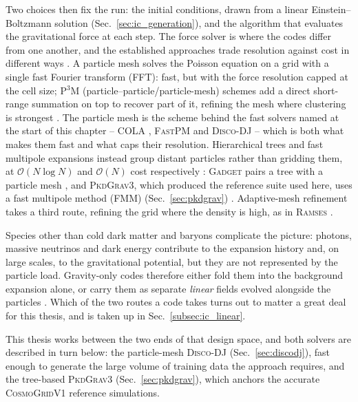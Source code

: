 \documentclass{report}
\begin{document}
Two choices then fix the run: the initial conditions, drawn from a linear Einstein--Boltzmann solution (Sec.~\ref{sec:ic_generation}), and the algorithm that evaluates the gravitational force at each step. The force solver is where the codes differ from one another, and the established approaches trade resolution against cost in different ways \cite{dehnen_n-body_2011}. A particle mesh solves the Poisson equation on a grid with a single fast Fourier transform (FFT): fast, but with the force resolution capped at the cell size; P$^3$M (particle--particle/particle-mesh) schemes add a direct short-range summation on top to recover part of it, refining the mesh where clustering is strongest \cite{couchman_mesh-refined_1991}. The particle mesh is the scheme behind the fast solvers named at the start of this chapter -- \textsc{COLA} \cite{tassev_solving_2013}, \textsc{FastPM} \cite{feng_fastpm_2016} and \textsc{Disco-DJ} \cite{list_disco-dj_2026} -- which is both what makes them fast and what caps their resolution. Hierarchical trees and fast multipole expansions instead group distant particles rather than gridding them, at \mbox{$\mathcal{O}(N\log N)$} and \mbox{$\mathcal{O}(N)$} cost respectively \cite{potter_pkdgrav3_2016}: \textsc{Gadget} pairs a tree with a particle mesh \cite{springel_simulating_2021}, and \textsc{PkdGrav3}, which produced the reference suite used here, uses a fast multipole method (FMM) (Sec.~\ref{sec:pkdgrav}) \cite{potter_pkdgrav3_2016}. Adaptive-mesh refinement takes a third route, refining the grid where the density is high, as in \textsc{Ramses} \cite{teyssier_cosmological_2002}.

Species other than cold dark matter and baryons complicate the picture: photons, massive neutrinos and dark energy contribute to the expansion history and, on large scales, to the gravitational potential, but they are not represented by the particle load. Gravity-only codes therefore either fold them into the background expansion alone, or carry them as separate \emph{linear} fields evolved alongside the particles \cite{dakin_cosmological_2022}. Which of the two routes a code takes turns out to matter a great deal for this thesis, and is taken up in Sec.~\ref{subsec:ic_linear}.

This thesis works between the two ends of that design space, and both solvers are described in turn below: the particle-mesh \textsc{Disco-DJ} (Sec.~\ref{sec:discodj}), fast enough to generate the large volume of training data the approach requires, and the tree-based \textsc{PkdGrav3} (Sec.~\ref{sec:pkdgrav}), which anchors the accurate \textsc{CosmoGridV1} reference simulations.
\end{document}
